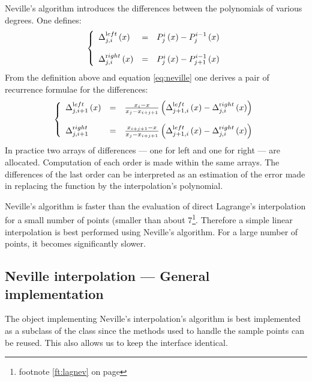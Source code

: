 Neville's algorithm introduces the differences between the
polynomials of various degrees. One defines:
\begin{equation}
\left\{ \begin{array}{lcl} \Delta_{j,i}^{\mathop{\textrm
left}}\left(x\right)
&=&P^i_j\left(x\right)-P^{i-1}_j\left(x\right)
\\*[3 ex] \Delta_{j,i}^{\mathop{\textrm right}}\left(x\right) &=&P^i_j\left(x\right)-P^{i-1}_{j+1}\left(x\right)
\end{array}\right.
\end{equation}
From the definition above and equation \ref{eq:neville} one
derives a pair of recurrence formulae for the differences:
\begin{equation}
\left\{ \begin{array}{lcl}\Delta_{j,i+1}^{\mathop{\textrm
left}}\left(x\right) &=&{x_i-x\over
x_j-x_{i+j+1}}\left(\Delta_{j+1,i}^{\mathop{\textrm
left}}\left(x\right)-\Delta_{j,i}^{\mathop{\textrm
right}}\left(x\right)\right)
\\*[3 ex] \Delta_{j,i+1}^{\mathop{\textrm right}} &=&{x_{i+j+1}-x\over
x_j-x_{i+j+1}}\left(\Delta_{j+1,i}^{\mathop{\textrm
left}}\left(x\right)-\Delta_{j,i}^{\mathop{\textrm
right}}\left(x\right)\right)
\end{array}\right.
\end{equation}
In practice two arrays of differences --- one for left and one for
right --- are allocated. Computation of each order is made within
the same arrays. The differences of the last order can be
interpreted as an estimation of the error made in replacing the
function by the interpolation's polynomial.

Neville's algorithm is faster than the evaluation of direct
Lagrange's interpolation for a small number of points (smaller
than about 7\footnote{\cf footnote \ref{ft:lagnev} on page
\pageref{ft:lagnev}}. Therefore a simple linear interpolation is
best performed using Neville's algorithm. For a large number of
points, it becomes significantly slower.

\subsection{ Neville interpolation --- General  implementation}
 The object implementing Neville's
interpolation's algorithm is best implemented as a subclass of the
class  since the methods used to handle
the sample points can be reused. This also allows us to keep the
interface identical.

